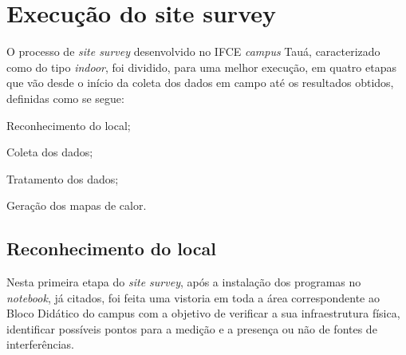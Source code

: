\begin{table}[H]
\end{table}

\section{Execução do site survey}
\label{sec:execucao-site-survey}

O processo de \textit{site survey} desenvolvido no IFCE \textit{campus} Tauá, caracterizado como do tipo \textit{indoor}, foi dividido, para uma melhor execução, em quatro etapas que vão desde o início da coleta dos dados em campo até os resultados obtidos, definidas como se segue:

\begin{compactenum}
	\item Reconhecimento do local;
	\item Coleta dos dados;
	\item Tratamento dos dados;
	\item Geração dos mapas de calor.
\end{compactenum}

\subsection{Reconhecimento do local}
\label{subsec:reconhecimento-do-local}

Nesta primeira etapa do \textit{site survey}, após a instalação dos programas no \textit{notebook}, já citados, foi feita uma vistoria em toda a área correspondente ao Bloco Didático do campus com a objetivo de verificar a sua infraestrutura física, identificar possíveis pontos para a medição e a presença ou não de fontes de interferências.

